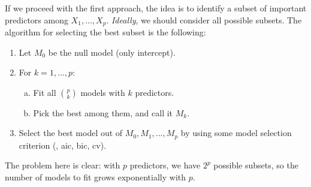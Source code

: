 If we proceed with the first approach, the idea is to identify a subset of important predictors among $X_1, \ldots, X_p$. \emph{Ideally}, we should consider all possible subsets. The algorithm for selecting the best subset is the following:
\begin{enumerate}
    \item Let $M_0$ be the null model (only intercept).
    \item For $k = 1, \ldots, p$:
          \begin{enumerate}[a., beginpenalty=10000]
              \item Fit all $\binom{p}{k}$ models with $k$ predictors.
              \item Pick the best among them, and call it $M_k$.
          \end{enumerate}
    \item Select the best model out of $M_0, M_1, \ldots, M_p$ by using some model selection criterion (\eg, \acs{aic}, \acs{bic}, \acs{cv}).
\end{enumerate}

The problem here is clear: with $p$ predictors, we have $2^p$ possible subsets, so the number of models to fit grows exponentially with $p$.

